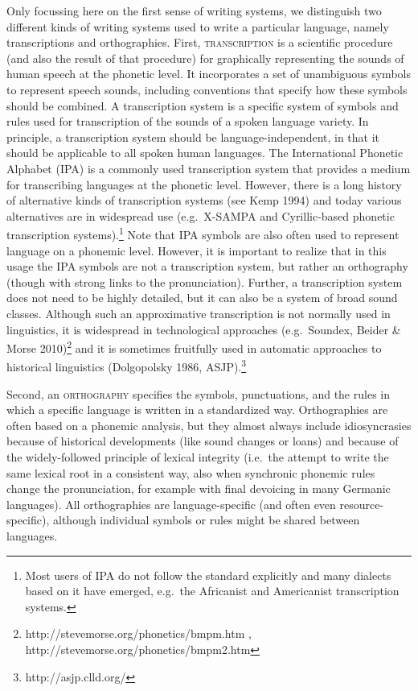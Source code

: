 Only focussing here on the first sense of writing systems, we distinguish two different kinds of writing systems used to write a particular language, namely transcriptions and orthographies. First, \textsc{transcription} is a scientific procedure (and also the result of that procedure) for graphically representing the sounds of human speech at the phonetic level. It incorporates a set of unambiguous symbols to represent speech sounds, including conventions that specify how these symbols should be combined. A transcription system is a specific system of symbols and rules used for transcription of the sounds of a spoken language variety. In principle, a transcription system should be language-independent, in that it should be applicable to all spoken human languages. The International Phonetic Alphabet (IPA) is a commonly used transcription system that provides a medium for transcribing languages at the phonetic level. However, there is a long history of alternative kinds of transcription systems (see Kemp 1994) and today various alternatives are in widespread use (e.g.~X-SAMPA and Cyrillic-based phonetic transcription systems).\footnote{Most users of IPA do not follow the standard explicitly and many dialects based on it have emerged, e.g.~the Africanist and Americanist transcription systems.} Note that IPA symbols are also often used to represent language on a phonemic level. However, it is important to realize that in this usage the IPA symbols are not a transcription system, but rather an orthography (though with strong links to the pronunciation). Further, a transcription system does not need to be highly detailed, but it can also be a system of broad sound classes. Although such an approximative transcription is not normally used in linguistics, it is widespread in technological approaches (e.g.~Soundex, Beider \& Morse 2010)\footnote{http://stevemorse.org/phonetics/bmpm.htm , http://stevemorse.org/phonetics/bmpm2.htm} and it is sometimes fruitfully used in automatic approaches to historical linguistics (Dolgopolsky 1986, ASJP).\footnote{http://asjp.clld.org/}

Second, an \textsc{orthography} specifies the symbols, punctuations, and the rules in which a specific language is written in a standardized way. Orthographies are often based on a phonemic analysis, but they almost always include idiosyncrasies because of historical developments (like sound changes or loans) and because of the widely-followed principle of lexical integrity (i.e.~the attempt to write the same lexical root in a consistent way, also when synchronic phonemic rules change the pronunciation, for example with final devoicing in many Germanic languages). All orthographies are language-specific (and often even resource-specific), although individual symbols or rules might be shared between languages. 

